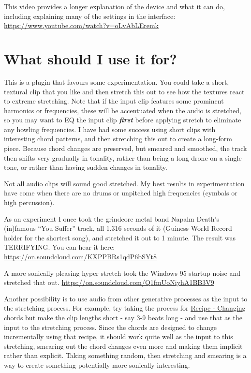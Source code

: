 \documentclass[
  12pt,
  letterpaper,
  oneside,
  open=any]{scrbook}
\begin{document}
This video provides a longer explanation of the device and what it can
do, including explaining many of the settings in the interface:
\url{https://www.youtube.com/watch?v=oLvAbLEremk}

\section{What should I use it for?}\label{what-should-i-use-it-for}

This is a plugin that favours some experimentation. You could take a
short, textural clip that you like and then stretch this out to see how
the textures react to extreme stretching. Note that if the input clip
features some prominent harmonics or frequencies, these will be
accentuated when the audio is stretched, so you may want to EQ the input
clip \textbf{\emph{first}} before applying stretch to eliminate any
howling frequencies. I have had some success using short clips with
interesting chord patterns, and then stretching this out to create a
long-form piece. Because chord changes are preserved, but smeared and
smoothed, the track then shifts very gradually in tonality, rather than
being a long drone on a single tone, or rather than having sudden
changes in tonality.

Not all audio clips will sound good stretched. My best results in
experimentation have come when there are no drums or unpitched high
frequencies (cymbals or high percussion).

As an experiment I once took the grindcore metal band Napalm Death's
(in)famous ``You Suffer'' track, all 1.316 seconds of it (Guiness World
Record holder for the shortest song), and stretched it out to 1 minute.
The result was TERRIFYING. You can hear it here:
\url{https://on.soundcloud.com/KXPPBRs1qdP6bSYt8}

A more sonically pleasing hyper stretch took the Windows 95 startup
noise and stretched that out.
\url{https://on.soundcloud.com/Q1fmUoNiyhA1BB3V9}

Another possibility is to use audio from other generative processes as
the input to the stretching process. For example, try taking the process
for \hyperref[Chapter-001-Recipe-Changing_Chords]{Recipe - Changing
chords} but make the clip lengths short - say 3-9 beats long - and use
that as the input to the stretching process. Since the chords are
designed to change incrementally using that recipe, it should work quite
well as the input to this stretching, smearing out the chord changes
even more and making them implicit rather than explicit. Taking
something random, then stretching and smearing is a way to create
something potentially more sonically interesting.
\end{document}
